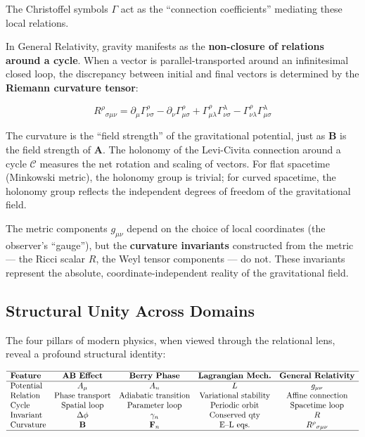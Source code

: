The Christoffel symbols $\Gamma$ act as the ``connection coefficients'' mediating these local relations.

In General Relativity, gravity manifests as the \textbf{non-closure of relations around a cycle}. When a vector is parallel-transported around an infinitesimal closed loop, the discrepancy between initial and final vectors is determined by the \textbf{Riemann curvature tensor}:

\begin{equation}
R^\rho{}_{\sigma\mu\nu} = \partial_\mu \Gamma^\rho_{\nu\sigma} - \partial_\nu \Gamma^\rho_{\mu\sigma} + \Gamma^\rho_{\mu\lambda}\Gamma^\lambda_{\nu\sigma} - \Gamma^\rho_{\nu\lambda}\Gamma^\lambda_{\mu\sigma}
\end{equation}

The curvature is the ``field strength'' of the gravitational potential, just as $\mathbf{B}$ is the field strength of $\mathbf{A}$. The holonomy of the Levi-Civita connection around a cycle $\mathcal{C}$ measures the net rotation and scaling of vectors. For flat spacetime (Minkowski metric), the holonomy group is trivial; for curved spacetime, the holonomy group reflects the independent degrees of freedom of the gravitational field.

The metric components $g_{\mu\nu}$ depend on the choice of local coordinates (the observer's ``gauge''), but the \textbf{curvature invariants} constructed from the metric --- the Ricci scalar $R$, the Weyl tensor components --- do not. These invariants represent the absolute, coordinate-independent reality of the gravitational field.

\subsection{Structural Unity Across Domains}\label{sec:structural_unity}

The four pillars of modern physics, when viewed through the relational lens, reveal a profound structural identity:

\begin{equation}
\begin{array}{lcccc}
\hline
\textbf{Feature} & \textbf{AB Effect} & \textbf{Berry Phase} & \textbf{Lagrangian Mech.} & \textbf{General Relativity} \\
\hline
\text{Potential} & A_\mu & A_n & L & g_{\mu\nu} \\
\text{Relation} & \text{Phase transport} & \text{Adiabatic transition} & \text{Variational stability} & \text{Affine connection} \\
\text{Cycle} & \text{Spatial loop} & \text{Parameter loop} & \text{Periodic orbit} & \text{Spacetime loop} \\
\text{Invariant} & \Delta\phi & \gamma_n & \text{Conserved qty} & R \\
\text{Curvature} & \mathbf{B} & \mathbf{F}_n & \text{E--L eqs.} & R^\rho{}_{\sigma\mu\nu} \\
\hline
\end{array}
\end{equation}

